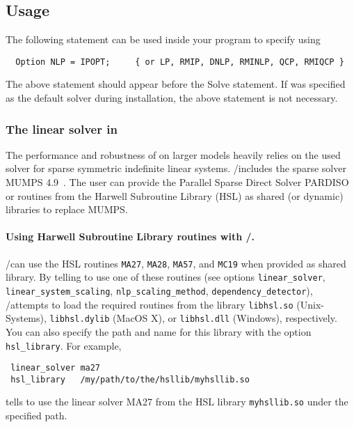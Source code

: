 \subsection{Usage}

The following statement can be used inside your \MYGAMS program to specify using \IPOPT
\begin{verbatim}
  Option NLP = IPOPT;     { or LP, RMIP, DNLP, RMINLP, QCP, RMIQCP }
\end{verbatim}

The above statement should appear before the Solve statement.
If \IPOPT was specified as the default solver during \MYGAMS installation, the above statement is not necessary.

\subsubsection{The linear solver in \IPOPT}
\label{ipoptlinearsolver}
\hypertarget{ipoptlinearsolver}{}

The performance and robustness of \IPOPT on larger models heavily relies on the used solver for sparse symmetric indefinite linear systems.
\MYGAMS/\IPOPT includes the sparse solver MUMPS 4.9~\cite{AmestoyDuffKosterLExcellent2001,AmestoyGuermoucheLExcellentPralet2006}.
The user can provide the Parallel Sparse Direct Solver PARDISO or routines from the Harwell Subroutine Library (HSL) as shared (or dynamic) libraries to replace MUMPS.

\paragraph{Using Harwell Subroutine Library routines with \MYGAMS/\IPOPT.}

\MYGAMS/\IPOPT can use the HSL routines \texttt{MA27}, \texttt{MA28}, \texttt{MA57}, and \texttt{MC19} when provided as shared library.
By telling \IPOPT to use one of these routines (see options \texttt{linear\_solver}, \texttt{linear\_system\_scaling}, \texttt{nlp\_scaling\_method}, \texttt{dependency\_detector}), \MYGAMS/\IPOPT attempts to load the required routines from the library \texttt{libhsl.so} (Unix-Systems), \texttt{libhsl.dylib} (MacOS X), or \texttt{libhsl.dll} (Windows), respectively.
You can also specify the path and name for this library with the option \texttt{hsl\_library}.
For example,
\begin{verbatim}
 linear_solver ma27
 hsl_library   /my/path/to/the/hsllib/myhsllib.so
\end{verbatim}
tells \IPOPT to use the linear solver MA27 from the HSL library \verb=myhsllib.so= under the specified path.

